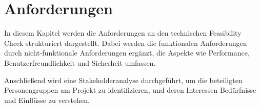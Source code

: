\chapter{Anforderungen}\label{Chap:Anforderungen}

In diesem Kapitel werden die Anforderungen an den technischen Feasibility Check strukturiert dargestellt. Dabei werden die funktionalen Anforderungen durch nicht-funktionale Anforderungen ergänzt, die Aspekte wie Performance, Benutzerfreundlichkeit und Sicherheit umfassen.

Anschließend wird eine Stakeholderanalyse durchgeführt, um die beteiligten Personengruppen am Projekt zu identifizieren, und deren Interessen Bedürfnisse und Einflüsse zu verstehen. 









